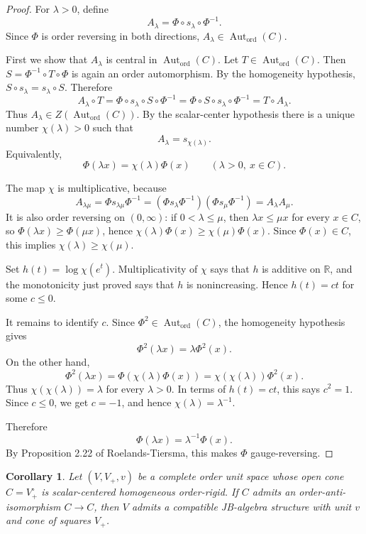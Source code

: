 \documentclass[11pt]{article}
\newtheorem{corollary}{Corollary}
\newcommand{\Autord}{\operatorname{Aut}_{\mathrm{ord}}}
\begin{document}
\begin{proof}
For \(\lambda>0\), define
\[
  A_\lambda=\Phi\circ s_\lambda\circ\Phi^{-1}.
\]
Since \(\Phi\) is order reversing in both directions, \(A_\lambda\in\Autord(C)\).

First we show that \(A_\lambda\) is central in \(\Autord(C)\). Let
\(T\in\Autord(C)\). Then \(S=\Phi^{-1}\circ T\circ\Phi\) is again an order
automorphism. By the homogeneity hypothesis, \(S\circ s_\lambda=s_\lambda\circ S\).
Therefore
\[
  A_\lambda\circ T
  =\Phi\circ s_\lambda\circ S\circ\Phi^{-1}
  =\Phi\circ S\circ s_\lambda\circ\Phi^{-1}
  =T\circ A_\lambda.
\]
Thus \(A_\lambda\in Z(\Autord(C))\). By the scalar-center hypothesis there is a
unique number \(\chi(\lambda)>0\) such that
\[
  A_\lambda=s_{\chi(\lambda)}.
\]
Equivalently,
\[
  \Phi(\lambda x)=\chi(\lambda)\Phi(x)
  \qquad(\lambda>0,\ x\in C).
\]

The map \(\chi\) is multiplicative, because
\[
  A_{\lambda\mu}
  =\Phi s_{\lambda\mu}\Phi^{-1}
  =(\Phi s_\lambda\Phi^{-1})(\Phi s_\mu\Phi^{-1})
  =A_\lambda A_\mu.
\]
It is also order reversing on \((0,\infty)\): if \(0<\lambda\le\mu\), then
\(\lambda x\le\mu x\) for every \(x\in C\), so
\(\Phi(\lambda x)\ge\Phi(\mu x)\), hence
\(\chi(\lambda)\Phi(x)\ge\chi(\mu)\Phi(x)\). Since \(\Phi(x)\in C\), this
implies \(\chi(\lambda)\ge\chi(\mu)\).

Set \(h(t)=\log\chi(e^t)\). Multiplicativity of \(\chi\) says that \(h\) is
additive on \(\mathbb{R}\), and the monotonicity just proved says that \(h\) is
nonincreasing. Hence \(h(t)=ct\) for some \(c\le 0\).

It remains to identify \(c\). Since \(\Phi^2\in\Autord(C)\), the homogeneity
hypothesis gives
\[
  \Phi^2(\lambda x)=\lambda\Phi^2(x).
\]
On the other hand,
\[
  \Phi^2(\lambda x)
  =\Phi(\chi(\lambda)\Phi(x))
  =\chi(\chi(\lambda))\Phi^2(x).
\]
Thus \(\chi(\chi(\lambda))=\lambda\) for every \(\lambda>0\). In terms of
\(h(t)=ct\), this says \(c^2=1\). Since \(c\le0\), we get \(c=-1\), and hence
\(\chi(\lambda)=\lambda^{-1}\).

Therefore
\[
  \Phi(\lambda x)=\lambda^{-1}\Phi(x).
\]
By Proposition 2.22 of Roelands-Tiersma, this makes \(\Phi\) gauge-reversing.
\end{proof}

\begin{corollary}
Let \((V,V_+,v)\) be a complete order unit space whose open cone
\(C=V_+^\circ\) is scalar-centered homogeneous order-rigid. If \(C\) admits an
order-anti-isomorphism \(C\to C\), then \(V\) admits a compatible JB-algebra
structure with unit \(v\) and cone of squares \(V_+\).
\end{corollary}
\end{document}
